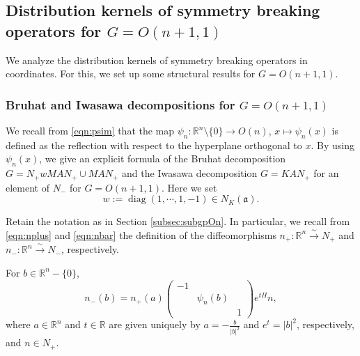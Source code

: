 \subsection{Distribution kernels of symmetry breaking operators
 for $G=O(n+1,1)$}
We analyze the distribution kernels
 of symmetry breaking operators
 in coordinates.  
For this,
 we set up some structural results
 for $G=O(n+1,1)$.  

\subsubsection{Bruhat and Iwasawa decompositions for $G=O(n+1,1)$}
\label{subsec:KAN}

We recall from \eqref{eqn:psim}
 that the map $\psi_n \colon {\mathbb{R}}^n \setminus \{0\}\to O(n)$, 
 $x \mapsto \psi_n(x)$
 is defined as the reflection
 with respect to the hyperplane orthogonal to $x$.  
By using $\psi_n(x)$, 
 we give an explicit formula
 of the Bruhat decomposition
 $G=N_+ w MAN_+
 \cup MA N_+$
 and the Iwasawa decomposition
 $G=KAN_+$
 for an element of $N_-$
 for $G=O(n+1,1)$.  
Here we set
\begin{equation}
\label{eqn:w}
w:= \operatorname{diag} (1,\cdots,1,-1) \in N_K({\mathfrak{a}}).  
\end{equation}


Retain the notation as in Section \ref{subsec:subgpOn}.  
In particular, 
 we recall from \eqref{eqn:nplus} and \eqref{eqn:nbar}
 the definition 
of the diffeomorphisms
$
n_+ \colon {\mathbb{R}}^n \overset \sim \to N_+
$
 and 
$
n_- \colon {\mathbb{R}}^n \overset \sim \to N_-
$, 
 respectively.  
\begin{lemma}
\label{lem:0.1}
For $b \in {\mathbb{R}}^n - \{0\}$, 
\[
n_-(b) = n_+(a)
\begin{pmatrix}
-1 & & 
\\
   & \psi_n(b) &
\\
 & & 1
\end{pmatrix}
e^{tH} n, 
\]
where $a \in {\mathbb{R}}^n$
 and $t \in {\mathbb{R}}$ are given uniquely by 
 $a =-\frac{b}{|b|^2}$ and $e^t =|b|^2$, 
 respectively, 
 and $n \in N_+$.  
\end{lemma}

